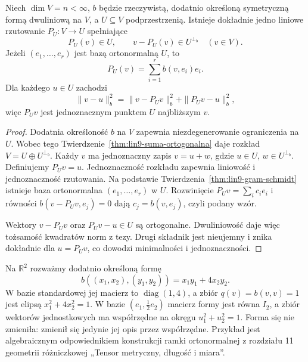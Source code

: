 \begin{twierdzenie}
\label{thm:lin9-rzut}
Niech \(\dim V=n<\infty\),
\(b\) będzie rzeczywistą,
dodatnio określoną symetryczną
formą dwuliniową na \(V\),
a \(U\subseteq V\) podprzestrzenią.
Istnieje dokładnie jedno
liniowe rzutowanie \(P_U\colon V\to U\)
spełniające
\[
 P_U(v)\in U,\qquad
 v-P_U(v)\in U^{\perp_b}
 \quad(v\in V).
\]
Jeżeli \((e_1,\ldots,e_r)\)
jest bazą ortonormalną \(U\), to
\[
 P_U(v)=\sum_{i=1}^r b(v,e_i)e_i.
\]
Dla każdego \(u\in U\)
zachodzi
\[
 \|v-u\|_b^2
 =\|v-P_Uv\|_b^2+\|P_Uv-u\|_b^2,
\]
więc \(P_Uv\) jest jednoznacznym
punktem \(U\) najbliższym \(v\).
\end{twierdzenie}
\begin{proof}
Dodatnia określoność \(b\)
na \(V\) zapewnia
niezdegenerowanie ograniczenia
na \(U\). Wobec tego
Twierdzenie~\ref{thm:lin9-suma-ortogonalna}
daje rozkład
\(V=U\oplus U^{\perp_b}\).
Każdy \(v\) ma jednoznaczny
zapis \(v=u+w\), gdzie
\(u\in U\), \(w\in U^{\perp_b}\).
Definiujemy \(P_Uv=u\).
Jednoznaczność rozkładu
zapewnia liniowość
i jednoznaczność rzutowania.
Na podstawie
Twierdzenia~\ref{thm:lin9-gram-schmidt}
istnieje baza ortonormalna
\((e_1,\ldots,e_r)\) w \(U\).
Rozwinięcie \(P_Uv=\sum_i c_ie_i\)
i równości
\(b(v-P_Uv,e_j)=0\)
dają \(c_j=b(v,e_j)\),
czyli podany wzór.

Wektory \(v-P_Uv\)
oraz \(P_Uv-u\in U\)
są ortogonalne.
Dwuliniowość daje więc
tożsamość kwadratów norm
z tezy. Drugi składnik
jest nieujemny i znika
dokładnie dla \(u=P_Uv\),
co dowodzi minimalności
i jednoznaczności.
\end{proof}

\begin{przyklad}
\label{prz:lin9-elipsa-metryka}
Na \(\mathbb R^2\) rozważmy
dodatnio określoną formę
\[
 b((x_1,x_2),(y_1,y_2))
 =x_1y_1+4x_2y_2.
\]
W bazie standardowej
jej macierz to
\(\operatorname{diag}(1,4)\),
a zbiór \(q(v)=b(v,v)=1\)
jest elipsą
\(x_1^2+4x_2^2=1\).
W bazie
\((e_1,\tfrac12e_2)\)
macierz formy jest równa \(I_2\),
a zbiór wektorów jednostkowych
ma współrzędne na okręgu
\(u_1^2+u_2^2=1\).
Forma się nie zmieniła:
zmienił się jedynie jej opis
przez współrzędne.
Przykład jest algebraicznym
odpowiednikiem konstrukcji
ramki ortonormalnej z
rozdziału 11 geometrii różniczkowej
„Tensor metryczny, długość i miara”.
\end{przyklad}

